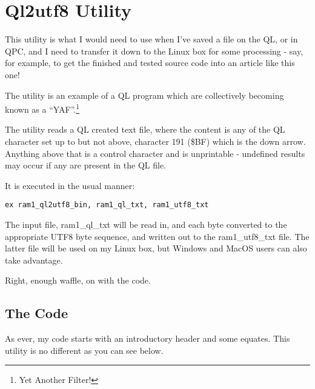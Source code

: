 \chapter{Ql2utf8 Utility}

This utility is what I would need to use when I've saved a file on
the QL, or in QPC, and I need to transfer it down to the Linux box
for some processing - say, for example, to get the finished and tested
source code into an article like this one!

The utility is an example of a QL program which are collectively becoming
known as a ``YAF''.\footnote{Yet Another Filter!}

The utility reads a QL created text file, where the content is any
of the QL character set up to but not above, character 191 (\$BF)
which is the down arrow. Anything above that is a control character
and is unprintable - undefined results may occur if any are present
in the QL file.

It is executed in the usual manner:

\begin{lstlisting}[numbers=none,caption={Executing ql2utf8}]
ex ram1_ql2utf8_bin, ram1_ql_txt, ram1_utf8_txt
\end{lstlisting}

The input file, ram1\_ql\_txt will be read in, and each byte converted
to the appropriate UTF8 byte sequence, and written out to the ram1\_utf8\_txt
file. The latter file will be used on my Linux box, but Windows and
MacOS users can also take advantage.

Right, enough waffle, on with the code.

\section{The Code}

As ever, my code starts with an introductory header and some equates.
This utility is no different as you can see below.

